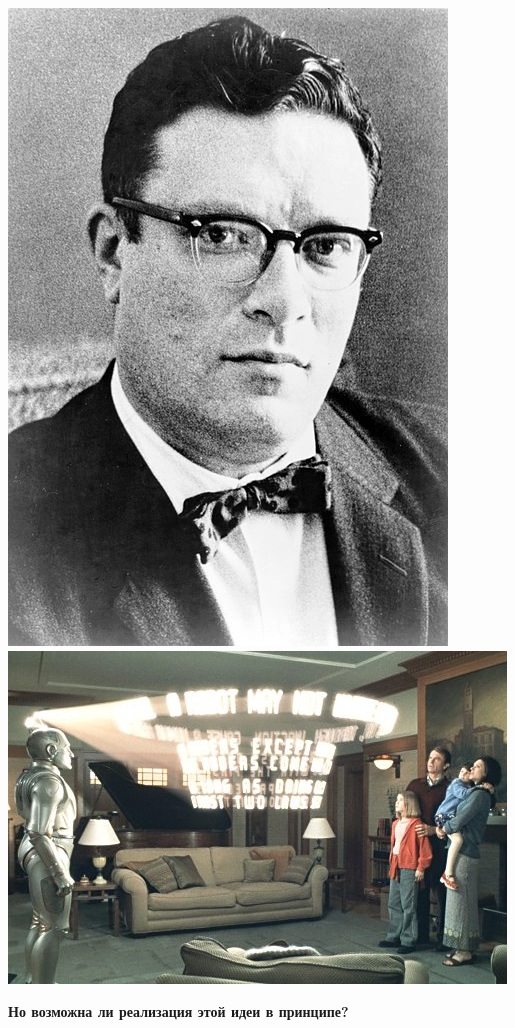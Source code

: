 \documentclass[default]{beamer}
\begin{document}
\begin{frame}
\begin{center}
			\includegraphics[height=0.25\textheight]{azimov.jpg}\quad
			\includegraphics[height=0.25\textheight]{three_laws.jpg}
		\end{center}

		\textbf{Но возможна ли реализация этой идеи в принципе?}

	\end{frame}
\end{document}
